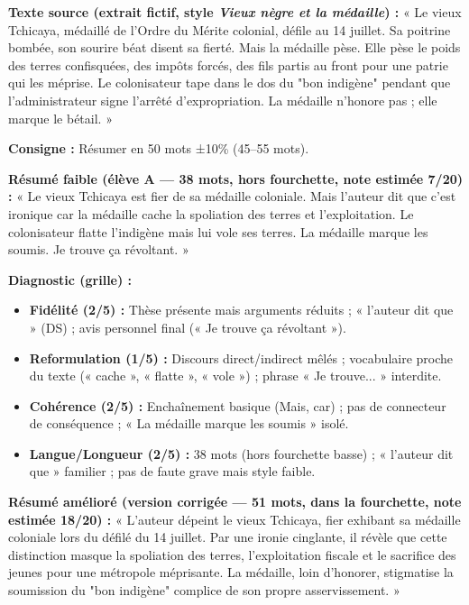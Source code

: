 \documentclass[11pt]{article}
\begin{document}
\begin{exoresolu}
\textbf{Texte source (extrait fictif, style \emph{Vieux nègre et la médaille}) :}
« Le vieux Tchicaya, médaillé de l'Ordre du Mérite colonial, défile au 14 juillet. Sa poitrine bombée, son sourire béat disent sa fierté. Mais la médaille pèse. Elle pèse le poids des terres confisquées, des impôts forcés, des fils partis au front pour une patrie qui les méprise. Le colonisateur tape dans le dos du "bon indigène" pendant que l'administrateur signe l'arrêté d'expropriation. La médaille n'honore pas ; elle marque le bétail. »

\textbf{Consigne :} Résumer en 50 mots ±10\% (45--55 mots).

\medskip
\textbf{Résumé faible (élève A — 38 mots, hors fourchette, note estimée 7/20) :}
« Le vieux Tchicaya est fier de sa médaille coloniale. Mais l'auteur dit que c'est ironique car la médaille cache la spoliation des terres et l'exploitation. Le colonisateur flatte l'indigène mais lui vole ses terres. La médaille marque les soumis. Je trouve ça révoltant. »

\medskip
\textbf{Diagnostic (grille) :}
\begin{itemize}
\item \textbf{Fidélité (2/5) :} Thèse présente mais arguments réduits ; « l'auteur dit que » (DS) ; avis personnel final (« Je trouve ça révoltant »).
\item \textbf{Reformulation (1/5) :} Discours direct/indirect mêlés ; vocabulaire proche du texte (« cache », « flatte », « vole ») ; phrase « Je trouve... » interdite.
\item \textbf{Cohérence (2/5) :} Enchaînement basique (Mais, car) ; pas de connecteur de conséquence ; « La médaille marque les soumis » isolé.
\item \textbf{Langue/Longueur (2/5) :} 38 mots (hors fourchette basse) ; « l'auteur dit que » familier ; pas de faute grave mais style faible.
\end{itemize}

\tcblower

\textbf{Résumé amélioré (version corrigée — 51 mots, dans la fourchette, note estimée 18/20) :}
« L'auteur dépeint le vieux Tchicaya, fier exhibant sa médaille coloniale lors du défilé du 14 juillet. Par une ironie cinglante, il révèle que cette distinction masque la spoliation des terres, l'exploitation fiscale et le sacrifice des jeunes pour une métropole méprisante. La médaille, loin d'honorer, stigmatise la soumission du "bon indigène" complice de son propre asservissement. »


\end{exoresolu}
\end{document}
